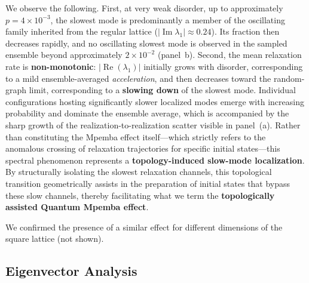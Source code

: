 \documentclass[pdflatex,sn-mathphys-num]{sn-jnl}
\renewcommand{\textcolor}[2]{#2}
\begin{document}
We observe the following. First, at very weak disorder, up to approximately $p=4\times10^{-3}$, the slowest mode is predominantly a member of the oscillating family inherited from the regular lattice ($|\operatorname{Im}\lambda_1| \approx 0.24$). Its fraction then decreases rapidly, and no oscillating slowest mode is observed in the sampled ensemble beyond approximately $2\times10^{-2}$ (panel~b). Second, the mean relaxation rate is \textbf{non-monotonic}: $|\operatorname{Re}(\lambda_1)|$ initially grows with disorder, corresponding to a mild ensemble-averaged \emph{acceleration}, and then decreases toward the random-graph limit, corresponding to a \textbf{slowing down} of the slowest mode. Individual configurations hosting significantly slower localized modes emerge with increasing probability and dominate the ensemble average, which is accompanied by the sharp growth of the realization-to-realization scatter visible in panel~(a).
\textcolor{green}{Rather than constituting the Mpemba effect itself---which strictly refers to the anomalous crossing of relaxation trajectories for specific initial states---this spectral phenomenon represents a \textbf{topology-induced slow-mode localization}. By structurally isolating the slowest relaxation channels, this topological transition geometrically assists in the preparation of initial states that bypass these slow channels, thereby facilitating what we term the \textbf{topologically assisted Quantum Mpemba effect}.}

We confirmed the presence of a similar effect for different dimensions of the square lattice (not shown).




\subsection{Eigenvector Analysis}
\end{document}
